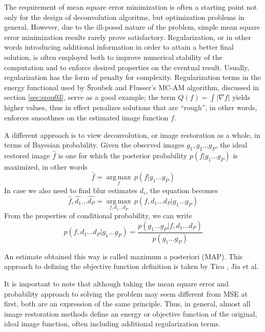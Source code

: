 \documentclass[12pt,notitlepage]{report}
\begin{document}
The requirement of mean square error minimization is often a starting point not only for the design of deconvolution algoritms, but optimization problems in general. However, due to the ill-posed nature of the problem, simple mean square error minimization results rarely prove satisfactory. Regularization, or in other words introducing additional information in order to attain a better final solution, is often employed both to improve numerical stability of the computation and to enforce desired properties on the eventual result. Usually, regularization has the form of penalty for complexity. Regularization terms in the energy functional used by Šroubek and Flusser's MC-AM algorithm, discussed in section \ref{sec:srou03}, serve as a good example; the term $Q(f) = \int |\nabla f|$ yields higher values, thus in effect penalizes solutions that are ``rough'', in other words, enforces smoothnes on the estimated image function $f$.        	 

A different approach is to view deconvolution, or image restoration as a whole, in terms of Bayesian probability. Given the observed images $g_1, g_2 \dots g_P$, the ideal restored image $\hat{f}$ is one for which the posterior probability $p(f|g_1 \dots g_P)$ is maximized, in other words 
\begin{equation}
	\label{eq:posterior_prob}
		\hat{f} = \underset{f}{\operatorname{arg\,max}} \, p(f|g_1 \dots g_P)
\end{equation}
In case we also need to find blur estimates $d_i$, the equation becomes 
\begin{equation}
	\label{eq:posterior_prob_ext}
		\hat{f},\hat{d_1} \dots \hat{d_P} = \underset{f,d_1 \dots d_P}{\operatorname{arg\,max}} \, p(f,d_1 \dots d_P |g_1 \dots g_P)
\end{equation}
From the properties of conditional probability, we can write 
\begin{equation}
	\label{eq:posterior_prob_prop}
		 p(f,d_1 \dots d_P |g_1 \dots g_P) = \frac{p(g_1 \dots g_P|f,d_1 \dots d_P)}{p(g_1 \dots g_P)}
\end{equation}

An estimate obtained this way is called maximum a posteriori (MAP). This approach to defining the objective function definition is taken by Tico \cite{tico06} \cite{tico07}, Jia et al. \cite{jia04}


It is important to note that although taking the mean square error and probability approach to solving the problem may seem different from MSE at first, both are an expression of the same principle. Thus, in general, almost all image restoration methods define an energy or objective function of the original, ideal image function, often including additional regularization terms. 
\end{document}
